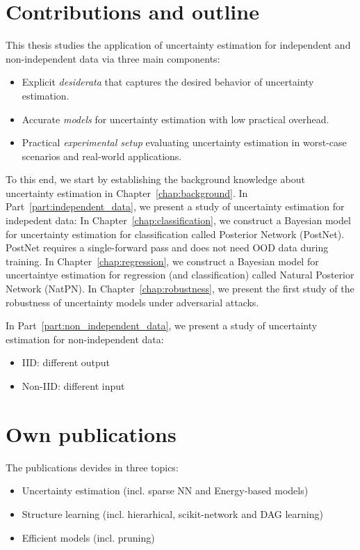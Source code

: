 \section{Contributions and outline}

This thesis studies the application of uncertainty estimation for independent and non-independent data via three main components:
\begin{itemize}
    \item Explicit \emph{desiderata} that captures the desired behavior of uncertainty estimation.
    \item Accurate \emph{models} for uncertainty estimation with low practical overhead.
    \item Practical \emph{experimental setup} evaluating uncertainty estimation in worst-case scenarios and real-world applications.
\end{itemize} 

To this end, we start by establishing the background knowledge about uncertainty estimation in Chapter~\ref{chap:background}.
In Part~\ref{part:independent_data}, we present a study of uncertainty estimation for indepedent data: 
In Chapter~\ref{chap:classification}, we construct a Bayesian model for uncertainty estimation for classification called Posterior Network (PostNet). PostNet requires a single-forward pass and does not need OOD data during training.
In Chapter~\ref{chap:regression}, we construct a Bayesian model for uncertaintye estimation for regression (and classification) called Natural Posterior Network (NatPN).
In Chapter~\ref{chap:robustness}, we present the first study of the robustness of uncertainty models under adversarial attacks. 

In Part~\ref{part:non_independent_data}, we present a study of uncertainty estimation for non-independent data:


\begin{itemize}
    \item IID: different output
    \item Non-IID: different input
\end{itemize}

\section{Own publications}

The publications devides in three topics:
\begin{itemize}
\item Uncertainty estimation (incl. sparse NN and Energy-based models)
\item Structure learning (incl. hierarhical, scikit-network and DAG learning)
\item Efficient models (incl. pruning)
\end{itemize}